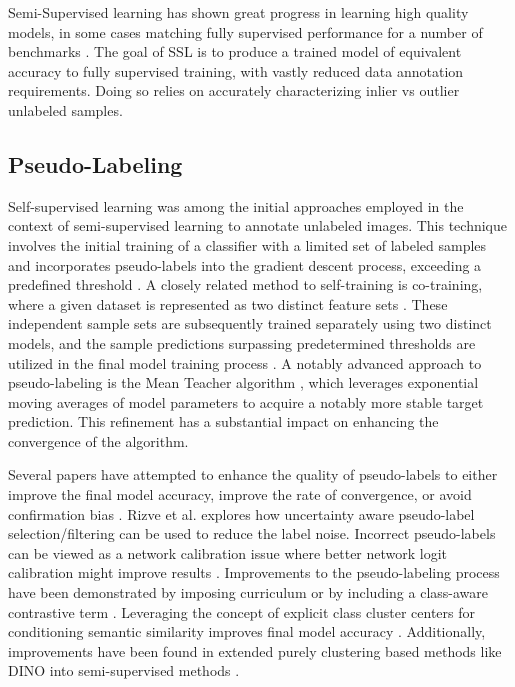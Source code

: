 \documentclass[10pt,twocolumn,letterpaper]{article}
\begin{document}
Semi-Supervised learning has shown great progress in learning high quality models, in some cases matching fully supervised performance for a number of benchmarks \cite{zhang2021flexmatch}.
The goal of SSL is to produce a trained model of equivalent accuracy to fully supervised training, with vastly reduced data annotation requirements.
Doing so relies on accurately characterizing inlier vs outlier unlabeled samples.

\subsection{Pseudo-Labeling}
Self-supervised learning was among the initial approaches employed in the context of semi-supervised learning to annotate unlabeled images. 
This technique involves the initial training of a classifier with a limited set of labeled samples and incorporates pseudo-labels into the gradient descent process, exceeding a predefined threshold \cite{yarowsky1995unsupervised, mcclosky2006reranking, olivier2006semi,zhai2019s4l,livieris2019predicting,rosenberg2005semi,menon2020deep}. 
A closely related method to self-training is co-training, where a given dataset is represented as two distinct feature sets \cite{blum1998combining}. 
These independent sample sets are subsequently trained separately using two distinct models, and the sample predictions surpassing predetermined thresholds are utilized in the final model training process \cite{blum1998combining,prakash2014survey}.
A notably advanced approach to pseudo-labeling is the Mean Teacher algorithm \cite{tarvainen2017mean}, which leverages exponential moving averages of model parameters to acquire a notably more stable target prediction. 
This refinement has a substantial impact on enhancing the convergence of the algorithm.

Several papers have attempted to enhance the quality of pseudo-labels to either improve the final model accuracy, improve the rate of convergence, or avoid confirmation bias \cite{arazo2020pseudo}.
Rizve et al. \cite{rizve2021defense} explores how uncertainty aware pseudo-label selection/filtering can be used to reduce the label noise.
Incorrect pseudo-labels can be viewed as a network calibration issue \cite{rizve2021defense} where better network logit calibration might improve results \cite{Xing2020DistanceBased}.
Improvements to the pseudo-labeling process have been demonstrated by imposing curriculum \cite{zhang2021flexmatch} or by including a class-aware contrastive term \cite{yang2022class}.
Leveraging the concept of explicit class cluster centers for conditioning semantic similarity improves final model accuracy \cite{zheng2022simmatch}.
Additionally, improvements have been found in extended purely clustering based methods like DINO \cite{caron2021emerging} into semi-supervised methods \cite{fini2023semi}.
\end{document}
